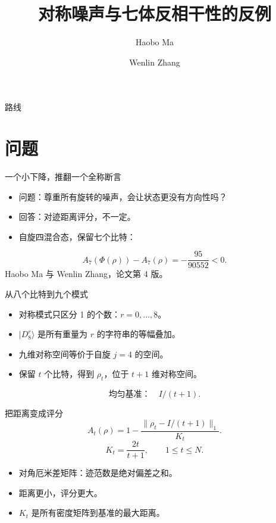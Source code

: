 \documentclass{beamer}
\title{对称噪声与七体反相干性的反例}
\author{Haobo Ma \and Wenlin Zhang}
\begin{document}
\begin{frame}
\titlepage
{}
\end{frame}
\begin{frame}{路线}
\tableofcontents
{}
\end{frame}
\section{问题}
\begin{frame}{一个小下降，推翻一个全称断言}
\begin{itemize}
\item 问题：尊重所有旋转的噪声，会让状态更没有方向性吗？
\item 回答：对迹距离评分，不一定。
\item 自旋四混合态，保留七个比特：
\end{itemize}
\[A_7(\Phi(\rho))-A_7(\rho)=-\frac{95}{90552}<0.\]
\small Haobo Ma 与 Wenlin Zhang，论文第 4 版。
\end{frame}
\begin{frame}{从八个比特到九个模式}
\begin{itemize}
\item 对称模式只区分 1 的个数：$r=0,\ldots,8$。
\item $|D_8^r\rangle$ 是所有重量为 $r$ 的字符串的等幅叠加。
\item 九维对称空间等价于自旋 $j=4$ 的空间。
\item 保留 $t$ 个比特，得到 $\rho_t$，位于 $t+1$ 维对称空间。
\end{itemize}
\[\text{均匀基准：}\quad I/(t+1).\]
\end{frame}
\begin{frame}{把距离变成评分}
\[ A_t(\rho)=1-\frac{\|\rho_t-I/(t+1)\|_1}{K_t}. \]
\[ K_t=\frac{2t}{t+1},\qquad 1\leq t\leq N. \]
\begin{itemize}
\item 对角厄米差矩阵：迹范数是绝对偏差之和。
\item 距离更小，评分更大。
\item $K_t$ 是所有密度矩阵到基准的最大距离。
\end{itemize}
\end{frame}
\end{document}
